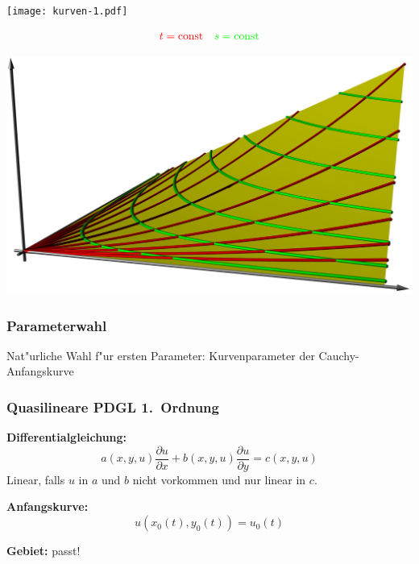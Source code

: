 \begin{frame}
\frametitle{}
\begin{center}
\texttt{[image: kurven-1.pdf]}
\end{center}
\[
\color{red} t=\text{const}
\quad
\color{green} s=\text{const}
\]
\end{frame}

\begin{frame}
\begin{center}
\includegraphics[width=\hsize]{surface.jpg}
\end{center}
\end{frame}


\begin{frame}
\frametitle{Parameterwahl}
Nat"urliche Wahl f"ur ersten Parameter: Kurvenparameter der Cauchy-Anfangskurve
\end{frame}

\begin{frame}
\frametitle{Quasilineare PDGL 1.~Ordnung}
{\bf Differentialgleichung:}
\[
a(x,y,u)\frac{\partial u}{\partial x}+b(x,y,u)\frac{\partial u}{\partial y}
=c(x,y,u)
\]
\pause
Linear, falls $u$ in $a$ und $b$ nicht vorkommen und nur linear in $c$.
\pause

\medskip

{\bf Anfangskurve:}
\pause
\[
u(x_0(t),y_0(t))=u_0(t)
\]
\pause

\smallskip

{\bf Gebiet:} \pause passt!
\end{frame}

